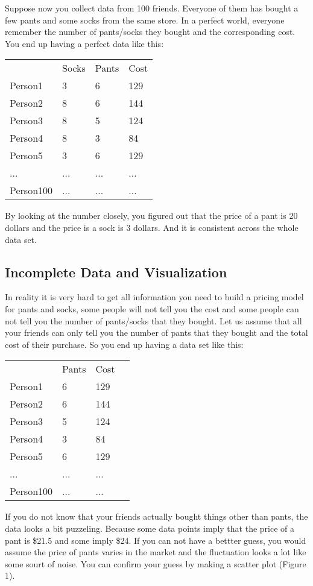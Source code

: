\documentclass[12pt, oneside]{article}
\begin{document}
Suppose now you collect data from 100 friends. Everyone of them has bought a few pants and some socks from the same store. In a perfect world, everyone remember the number of pants/socks they bought and the corresponding cost. You end up having a perfect data like this:

\vspace{.1in}
\begin{tabular}{llll}
 &Socks  &Pants &Cost  \\
Person1 &3	&6	&129\\
Person2 &8	&6	&144\\
Person3 &8	&5	&124\\
Person4 &8	&3	&84\\
Person5 &3	&6	&129\\
... & ... &... &...\\
Person100 & ...&...&...
\end{tabular}
\vspace{.1in}

By looking at the number closely, you figured out that the price of a pant is 20 dollars and the price is a sock is 3 dollars. And it is consistent across the whole data set.

\subsection{Incomplete Data and Visualization }
In reality it is very hard to get all information you need to build a pricing model for pants and socks, some people will not tell you the cost and some people can not tell you the number of pants/socks that they bought. Let us assume that all your friends can only tell you the number of pants that they bought and the total cost of their purchase. So you end up having a data set like this:

\vspace{.1in}
\begin{tabular}{llll}
 &Pants   &Cost  \\
Person1 &6	&129\\
Person2 &6	&144\\
Person3 &5	&124\\
Person4 &3	&84\\
Person5 &6	&129\\
... & ... &...\\
Person100 &...&...
\end{tabular}
\vspace{.1in}

If you do not know that your friends actually bought things other than pants, the data looks a bit puzzeling. Because some data points imply that the price of a pant is \$21.5 and some imply \$24. If you can not have a bettter guess, you would assume the price of pants varies in the market and the fluctuation looks a lot like some sourt of noise. You can confirm your guess by making a scatter plot (Figure 1).
\end{document}
